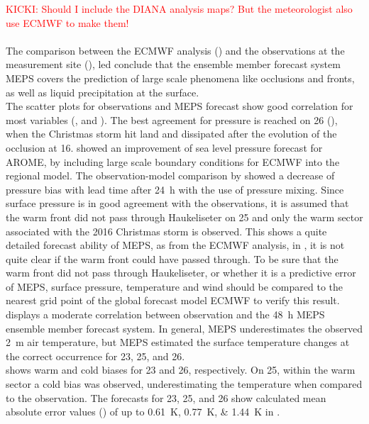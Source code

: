 \textcolor{red}{KICKI: Should I include the DIANA analysis maps? But the meteorologist also use ECMWF to make them!}
%
\\
\\
The comparison between the ECMWF analysis () and the observations at the measurement site (), led conclude that the ensemble member forecast system MEPS covers the prediction of large scale phenomena like occlusions and fronts, as well as liquid precipitation at the surface. 
\\
The scatter plots for observations and MEPS forecast show good correlation for most variables (, and ).
The best agreement for pressure is reached on \SI{26}{\dec} (), when the Christmas storm hit land and dissipated after the evolution of the occlusion at \SI{16}{\UTC}. \citet{dahlgren_comparison_2013} showed an improvement of sea level pressure forecast for AROME, by including large scale boundary conditions for ECMWF into the regional model. The observation-model comparison by \citet{dahlgren_comparison_2013} showed a decrease of pressure bias with lead time after \SI{24}{\hour} with the use of pressure mixing. 
Since surface pressure is in good agreement with the observations, it is assumed that the warm front did not pass through Haukeliseter on \SI{25}{\dec} and only the warm sector associated with the 2016 Christmas storm is observed. This shows a quite detailed forecast ability of MEPS, as from the ECMWF analysis, in , it is not quite clear if the warm front could have passed through. To be sure that the warm front did not pass through Haukeliseter, or whether it is a predictive error of MEPS, surface pressure, temperature and wind should be compared to the nearest grid point of the global forecast model ECMWF to verify this result.
\\
 displays a moderate correlation between observation and the \SI{48}{\hour} MEPS ensemble member forecast system. In general, MEPS underestimates the observed \SI{2}{\metre} air temperature, but MEPS estimated the surface temperature changes at the correct occurrence for \num{23}, \num{25}, and \SI{26}{\dec}. 
\\
 shows warm and cold biases for \num{23} and \SI{26}{\dec}, respectively. On \SI{25}{\dec}, within the warm sector a cold bias was observed, underestimating the temperature when compared to the observation.  The forecasts for \num{23}, \num{25}, and \SI{26}{\dec} show calculated mean absolute error values () of up to \SIlist{0.61;0.77;1.44}{\kelvin} in . 
